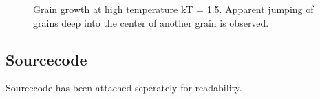 \documentclass{report}
\begin{document}
\begin{figure}[!htb]
{        }
        \caption{Grain growth at high temperature kT = 1.5. Apparent jumping of grains deep into the center of another grain is observed.}
    \end{figure}


    \subsection{Sourcecode}
    Sourcecode has been attached seperately for readability.
\end{document}
